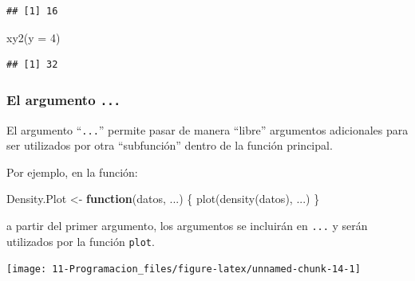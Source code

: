 \documentclass[
]{book}
\newenvironment{Shaded}{\begin{snugshade}}{\end{snugshade}}
\newcommand{\AttributeTok}[1]{\textcolor[rgb]{0.77,0.63,0.00}{#1}}
\newcommand{\ControlFlowTok}[1]{\textcolor[rgb]{0.13,0.29,0.53}{\textbf{#1}}}
\newcommand{\DecValTok}[1]{\textcolor[rgb]{0.00,0.00,0.81}{#1}}
\newcommand{\FunctionTok}[1]{\textcolor[rgb]{0.00,0.00,0.00}{#1}}
\newcommand{\NormalTok}[1]{#1}
\newcommand{\OtherTok}[1]{\textcolor[rgb]{0.56,0.35,0.01}{#1}}
\newcommand{\SpecialCharTok}[1]{\textcolor[rgb]{0.00,0.00,0.00}{#1}}
\newcommand{\StringTok}[1]{\textcolor[rgb]{0.31,0.60,0.02}{#1}}
\theoremstyle{break}
\begin{document}
\begin{verbatim}
## [1] 16
\end{verbatim}

\begin{Shaded}
\begin{Highlighting}[]
\FunctionTok{xy2}\NormalTok{(}\AttributeTok{y =} \DecValTok{4}\NormalTok{)}
\end{Highlighting}
\end{Shaded}

\begin{verbatim}
## [1] 32
\end{verbatim}

\hypertarget{el-argumento-...}{%
\subsubsection{\texorpdfstring{El argumento \texttt{...}}{El argumento ...}}\label{el-argumento-...}}

El argumento ``\texttt{...}'' permite
pasar de manera ``libre'' argumentos adicionales para ser utilizados por otra ``subfunción''
dentro de la función principal.

Por ejemplo, en la función:

\begin{Shaded}
\begin{Highlighting}[]
\NormalTok{Density.Plot }\OtherTok{\textless{}{-}} \ControlFlowTok{function}\NormalTok{(datos, ...) \{ }\FunctionTok{plot}\NormalTok{(}\FunctionTok{density}\NormalTok{(datos), ...) \}}
\end{Highlighting}
\end{Shaded}

a partir del primer argumento, los argumentos se incluirán en \texttt{...}
y serán utilizados por la función \texttt{plot}.

\begin{Shaded}
\end{Shaded}

\begin{center}\texttt{[image: 11-Programacion\_files/figure-latex/unnamed-chunk-14-1]} \end{center}

\begin{Shaded}
\end{Shaded}
\end{document}
